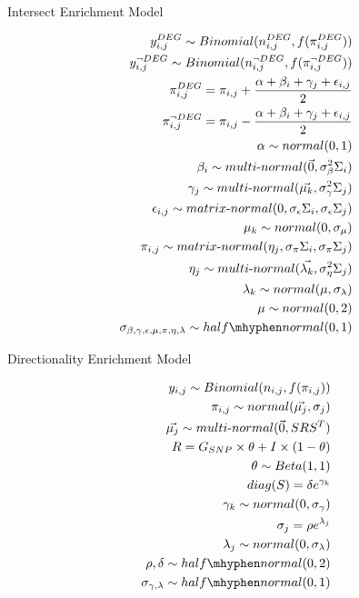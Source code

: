 \documentclass{article}
\numberwithin{equation}{section}
\begin{document}
\begin{center}{Intersect Enrichment Model}\end{center}
{\setcounter{section}{1}\setcounter{equation}{0}
\begin{align}
y^{DEG}_{i,j} \sim Binomial(n^{DEG}_{i,j}, f(\pi^{DEG}_{i,j}))\\
y^{\neg DEG}_{i,j} \sim Binomial(n^{\neg DEG}_{i,j}, f(\pi^{\neg DEG}_{i,j}))\\
\pi^{DEG}_{i,j} = \pi_{i,j} + \frac{\alpha + \beta_i + \gamma_j + \epsilon_{i,j}}{2}\\
\pi^{\neg DEG}_{i,j} = \pi_{i,j} - \frac{\alpha + \beta_i + \gamma_j + \epsilon_{i,j}}{2}\\
\alpha \sim normal(0, 1)\\
\beta_i \sim multi{\text -}normal(\vec{0}, \sigma_{\beta}^2\Sigma_{i})\\
\gamma_j \sim multi{\text -}normal(\vec{\mu_k}, \sigma_{\gamma}^2\Sigma_{j})\\
\epsilon_{i,j} \sim matrix{\text -}normal(0, \sigma_{\epsilon}\Sigma_{i}, \sigma_{\epsilon} \Sigma_{j})\\
\mu_k \sim normal(0, \sigma_{\mu})\\
\pi_{i,j} \sim matrix{\text -}normal(\eta_j, \sigma_{\pi}\Sigma_{i}, \sigma_{\pi} \Sigma_{j})\\
\eta_j \sim multi{\text -}normal(\vec{\lambda_k}, \sigma_{\eta}^2\Sigma_{j})\\
\lambda_k \sim normal(\mu, \sigma_{\lambda})\\
\mu \sim normal(0, 2)\\
\sigma_{\beta, \gamma, \epsilon, \mu, \pi, \eta, \lambda} \sim half\mhyphen normal(0,1)
\end{align}}


\begin{center}{Directionality Enrichment Model}\end{center}
\setcounter{section}{2}\setcounter{equation}{0}
\begin{align}
y_{i,j} \sim Binomial(n_{i,j}, f(\pi_{i,j}))\\
\pi_{i,j} \sim normal(\vec{\mu_j}, \sigma_j)\\
\vec{\mu_j} \sim multi{\text -}normal(\vec{0}, SRS^T)\\
R = G_{SNP} \times \theta + I \times (1-\theta)\\
\theta \sim Beta(1,1)\\
diag(S) = \delta e^{\gamma_k}\\
\gamma_k \sim normal(0, \sigma_{\gamma})\\
\sigma_j = \rho e^{\lambda_j}\\
\lambda_j \sim normal(0, \sigma_{\lambda})\\
\rho, \delta \sim half\mhyphen normal(0,2)\\
\sigma_{\gamma, \lambda} \sim half\mhyphen normal(0,1)
\end{align}
\end{document}
